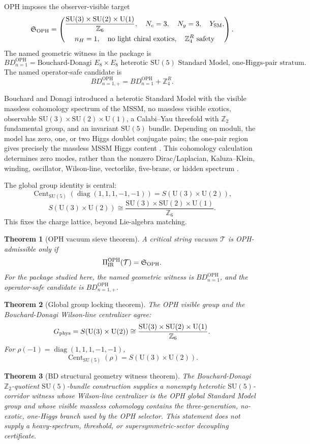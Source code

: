 \documentclass[11pt]{article}
\newtheorem{theorem}{Theorem}[section]
\theoremstyle{remark}
\theoremstyle{plain}
\newcommand{\OPH}{\mathrm{OPH}}
\newcommand{\SU}{\mathrm{SU}}
\newcommand{\U}{\mathrm{U}}
\newcommand{\Cent}{\operatorname{Cent}}
\newcommand{\diag}{\operatorname{diag}}
\newcommand{\Z}{\mathbb Z}
\newcommand{\ZfourR}{\mathbb Z_4^R}
\begin{document}
OPH imposes the observer-visible target
\[
\mathfrak S_{\OPH}=
\left(
\begin{gathered}
\dfrac{\SU(3)\times\SU(2)\times\U(1)}{\Z_6},\quad N_c=3,\quad N_g=3,\quad Y_{\rm SM},\\
n_H=1,\quad \text{no light chiral exotics},\quad \ZfourR\text{ safety}
\end{gathered}
\right).
\]
The named geometric witness in the package is
\[
\boxed{
BD_{n=1}^{\OPH}
=
\text{Bouchard-Donagi }E_8\times E_8
\text{ heterotic }\SU(5)\text{ Standard Model, one-Higgs-pair stratum}.
}
\]
The named operator-safe candidate is
\[
\boxed{
BD_{n=1,+}^{\OPH}
=
BD_{n=1}^{\OPH}+\ZfourR.
}
\]

Bouchard and Donagi introduced a heterotic Standard Model with the visible massless cohomology
spectrum of the MSSM, no massless visible exotics,
observable \(\SU(3)\times\SU(2)\times\U(1)\), a Calabi--Yau threefold with
\(\Z_2\) fundamental group, and an invariant \(\SU(5)\) bundle. Depending on moduli, the model
has zero, one, or two Higgs doublet conjugate pairs; the one-pair region gives precisely the
massless MSSM Higgs content \cite{BouchardDonagi2005}. This cohomology calculation determines
zero modes, rather than the nonzero Dirac/Laplacian, Kaluza--Klein, winding, oscillator,
Wilson-line, vectorlike, five-brane, or hidden spectrum
\cite{DonagiHeOvrutReinbacher2004}.

The global group identity is central:
\[
\Cent_{\SU(5)}(\diag(1,1,1,-1,-1))=S(\U(3)\times\U(2)),
\]
\[
S(\U(3)\times\U(2))
\cong
\frac{\SU(3)\times\SU(2)\times\U(1)}{\Z_6}.
\]
This fixes the charge lattice, beyond Lie-algebra matching.

\begin{theorem}[OPH vacuum sieve theorem]
A critical string vacuum \(\mathcal T\) is OPH-admissible only if
\[
\Pi_{\rm IR}^{\OPH}(\mathcal T)=\mathfrak S_{\OPH}.
\]
For the package studied here, the named geometric witness is \(BD_{n=1}^{\OPH}\), and the
operator-safe candidate is \(BD_{n=1,+}^{\OPH}\).
\end{theorem}

\begin{theorem}[Global group locking theorem]
The OPH visible group and the Bouchard-Donagi Wilson-line centralizer agree:
\[
G_{\rm phys}=S(\U(3)\times\U(2))
\cong
\frac{\SU(3)\times\SU(2)\times\U(1)}{\Z_6}.
\]
For \(\rho(-1)=\diag(1,1,1,-1,-1)\),
\[
\Cent_{\SU(5)}(\rho)=S(\U(3)\times\U(2)).
\]
\end{theorem}

\begin{theorem}[BD structural geometry witness theorem]
The Bouchard-Donagi \(\Z_2\)-quotient \(\SU(5)\)-bundle construction supplies a nonempty
heterotic \(\SU(5)\)-corridor witness whose Wilson-line centralizer is the OPH global Standard
Model group and whose visible massless cohomology contains the three-generation, no-exotic,
one-Higgs branch used by the OPH selector. This statement does not supply a heavy-spectrum,
threshold, or supersymmetric-sector decoupling certificate.
\end{theorem}
\end{document}
